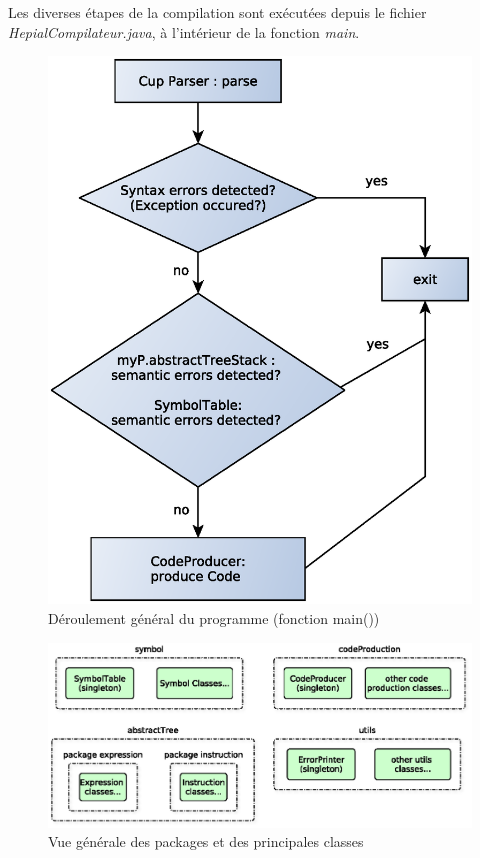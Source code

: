 \documentclass[11pt,a4paper]{article}
\begin{document}
  \par  Les diverses étapes de la compilation sont exécutées depuis le fichier \textit{HepialCompilateur.java}, à l'intérieur de la fonction \textit{main}.

  \begin{figure}[h]
    \includegraphics[width=.5\textwidth,center]{../ressources/mainProgramFlowChart.eps}
        \caption{Déroulement général du programme (fonction main())}
   \end{figure}

    \begin{figure}[h]
    \includegraphics[width=.75\textwidth,center]{../ressources/packagesOverview.eps}
        \caption{Vue générale des packages et des principales classes}
   \end{figure}
   
\end{document}
